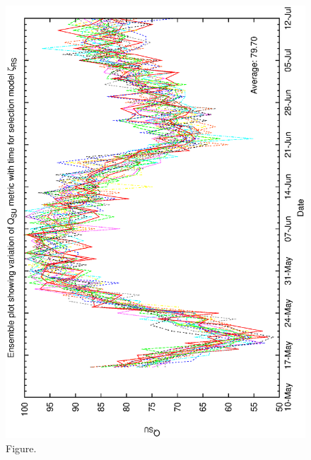 \documentclass[12pt,a4paper]{article}
\begin{document}
\begin{figure}[htbp]
 \begin{center}
  \includegraphics[scale=1.0, angle=0]{figures/biasrs_ensemble.eps}
 \end{center}
  \caption[Figure.]
{Figure.}
\end{figure}
\clearpage
\end{document}
